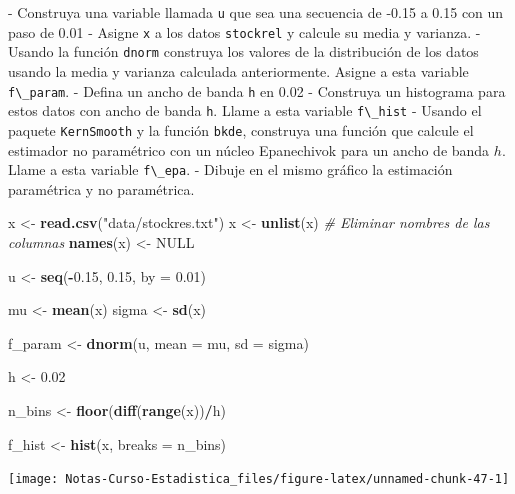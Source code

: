 \documentclass[
  12pt,
]{book}
\newenvironment{Shaded}{\begin{snugshade}}{\end{snugshade}}
\newcommand{\CommentTok}[1]{\textcolor[rgb]{0.56,0.35,0.01}{\textit{#1}}}
\newcommand{\DataTypeTok}[1]{\textcolor[rgb]{0.13,0.29,0.53}{#1}}
\newcommand{\FloatTok}[1]{\textcolor[rgb]{0.00,0.00,0.81}{#1}}
\newcommand{\KeywordTok}[1]{\textcolor[rgb]{0.13,0.29,0.53}{\textbf{#1}}}
\newcommand{\NormalTok}[1]{#1}
\newcommand{\OperatorTok}[1]{\textcolor[rgb]{0.81,0.36,0.00}{\textbf{#1}}}
\newcommand{\OtherTok}[1]{\textcolor[rgb]{0.56,0.35,0.01}{#1}}
\newcommand{\StringTok}[1]{\textcolor[rgb]{0.31,0.60,0.02}{#1}}
\theoremstyle{definition}
\theoremstyle{definition}
\theoremstyle{definition}
\theoremstyle{remark}
\let\BeginKnitrBlock\begin \let\EndKnitrBlock\end
\begin{document}
\BeginKnitrBlock{remark}
{}
- Construya una variable llamada \texttt{u} que sea una secuencia de -0.15 a 0.15 con un paso de 0.01
- Asigne \texttt{x} a los datos \texttt{stockrel} y calcule su media y varianza.
- Usando la función \texttt{dnorm} construya los valores de la distribución de los datos usando la media y varianza calculada anteriormente. Asigne a esta variable \texttt{f\textbackslash{}\_param}.
- Defina un ancho de banda \texttt{h} en 0.02
- Construya un histograma para estos datos con ancho de banda \texttt{h}. Llame a esta variable \texttt{f\textbackslash{}\_hist}
- Usando el paquete \texttt{KernSmooth} y la función \texttt{bkde}, construya una función que calcule el estimador no paramétrico con un núcleo Epanechivok para un ancho de banda \(h\). Llame a esta variable \texttt{f\textbackslash{}\_epa}.
- Dibuje en el mismo gráfico la estimación paramétrica y no paramétrica.
\EndKnitrBlock{remark}

\begin{Shaded}
\begin{Highlighting}[]
\NormalTok{x <-}\StringTok{ }\KeywordTok{read.csv}\NormalTok{(}\StringTok{"data/stockres.txt"}\NormalTok{)}
\NormalTok{x <-}\StringTok{ }\KeywordTok{unlist}\NormalTok{(x)}
\CommentTok{# Eliminar nombres de las columnas}
\KeywordTok{names}\NormalTok{(x) <-}\StringTok{ }\OtherTok{NULL}

\NormalTok{u <-}\StringTok{ }\KeywordTok{seq}\NormalTok{(}\OperatorTok{-}\FloatTok{0.15}\NormalTok{, }\FloatTok{0.15}\NormalTok{, }\DataTypeTok{by =} \FloatTok{0.01}\NormalTok{)}

\NormalTok{mu <-}\StringTok{ }\KeywordTok{mean}\NormalTok{(x)}
\NormalTok{sigma <-}\StringTok{ }\KeywordTok{sd}\NormalTok{(x)}

\NormalTok{f_param <-}\StringTok{ }\KeywordTok{dnorm}\NormalTok{(u, }\DataTypeTok{mean =}\NormalTok{ mu, }\DataTypeTok{sd =}\NormalTok{ sigma)}

\NormalTok{h <-}\StringTok{ }\FloatTok{0.02}

\NormalTok{n_bins <-}\StringTok{ }\KeywordTok{floor}\NormalTok{(}\KeywordTok{diff}\NormalTok{(}\KeywordTok{range}\NormalTok{(x))}\OperatorTok{/}\NormalTok{h)}

\NormalTok{f_hist <-}\StringTok{ }\KeywordTok{hist}\NormalTok{(x, }\DataTypeTok{breaks =}\NormalTok{ n_bins)}
\end{Highlighting}
\end{Shaded}

\begin{center}\texttt{[image: Notas-Curso-Estadistica\_files/figure-latex/unnamed-chunk-47-1]} \end{center}
\end{document}
